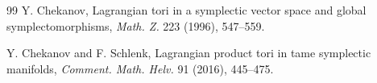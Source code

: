 \documentclass[12pt]{amsart}
\theoremstyle{definition}
\begin{document}
\begin{thebibliography} {99}
 Y. Chekanov, Lagrangian tori in a symplectic vector space and global symplectomorphisms, 
{\em Math. Z.} 223 (1996), 547--559.

 Y. Chekanov and F. Schlenk, Lagrangian product tori in tame symplectic manifolds, {\em Comment. Math. Helv.} 91 (2016), 445--475.


















\end{thebibliography}
\end{document}

